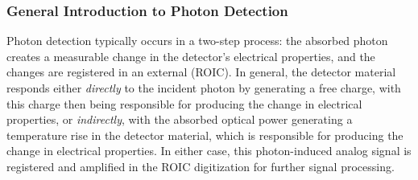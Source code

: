 \subsubsection{General Introduction to Photon Detection}
\label{introReceiver}
Photon detection typically occurs in a two-step process: the absorbed photon creates a measurable change in the detector's electrical properties, and the changes are registered in an external (\acl{ROIC}). In general, the detector material responds either \textit{directly} to the incident photon by generating a free charge, with this charge then being responsible for producing the change in electrical properties, or \textit{indirectly}, with the absorbed optical power generating a temperature rise in the detector material, which is responsible for producing the change in electrical properties. In either case, this photon-induced analog signal is registered and amplified in the \acs{ROIC} digitization for further signal processing. 

